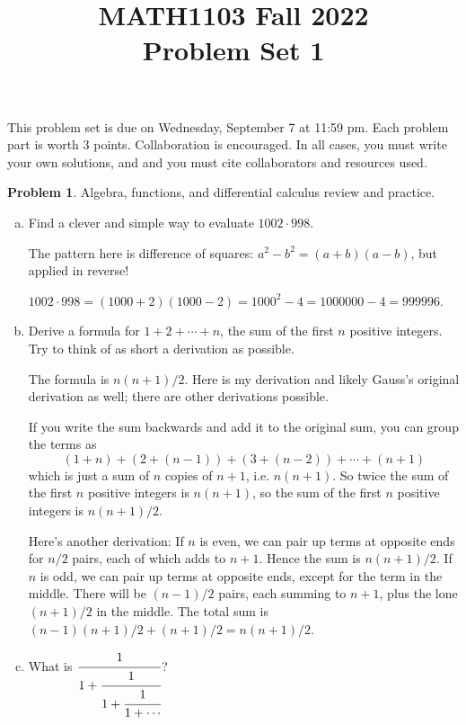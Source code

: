 \documentclass[11pt,oneside]{amsart}
\title{MATH1103 Fall 2022\\
Problem Set 1}
\theoremstyle{definition}
\newtheorem{problem}{Problem}
\begin{document}
    \maketitle
    This problem set is due on Wednesday, September 7 at 11:59 pm. Each problem part is worth 3 points. Collaboration is encouraged. In all cases, you must write your own solutions, and and you must cite collaborators and resources used.

    \begin{problem}
        Algebra, functions, and differential calculus review and practice.
        \begin{enumerate}[(a)]
            \item Find a clever and simple way to evaluate $1002\cdot 998$.
            \begin{solution}
                The pattern here is difference of squares: $a^2-b^2=(a+b)(a-b)$, but applied in reverse!
                
                $1002\cdot 998=(1000+2)(1000-2)=1000^2-4=1000000-4=999996$.
            \end{solution}
            \item Derive a formula for $1+2+\cdots+n$, the sum of the first $n$ positive integers. Try to think of as short a derivation as possible.
            \begin{solution}
                The formula is $n(n+1)/2$. Here is my derivation and likely Gauss's original derivation as well; there are other derivations possible.
                
                If you write the sum backwards and add it to the original sum, you can group the terms as
                \[(1+n)+(2+(n-1))+(3+(n-2))+\cdots+(n+1)\]
                which is just a sum of $n$ copies of $n+1$, i.e. $n(n+1)$. So twice the sum of the first $n$ positive integers is $n(n+1)$, so the sum of the first $n$ positive integers is $n(n+1)/2$.

                Here's another derivation: If $n$ is even, we can pair up terms at opposite ends for $n/2$ pairs, each of which adds to $n+1$. Hence the sum is $n(n+1)/2$. If $n$ is odd, we can pair up terms at opposite ends, except for the term in the middle. There will be $(n-1)/2$ pairs, each summing to $n+1$, plus the lone $(n+1)/2$ in the middle. The total sum is $(n-1)(n+1)/2+(n+1)/2=n(n+1)/2$.
            \end{solution}
            \item What is $\cfrac 1{1+\cfrac 1{1+\cfrac 1{1+\cdots}}}$?
            

\end{enumerate}
\end{problem}
\end{document}
